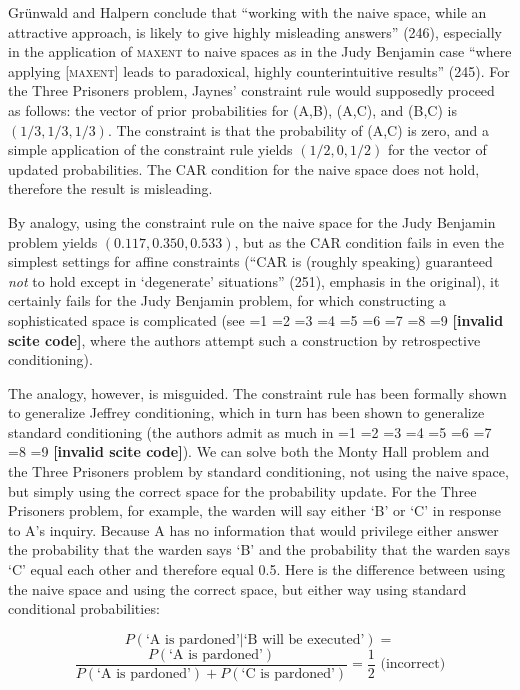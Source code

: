 \documentclass[smallextended]{svjour3}       %
\newcommand{\qnull}[1]{`#1'}
\newcommand{\qeins}[1]{``#1''}
\newcommand{\qzwei}[1]{`#1'}
\newcommand{\PageP}{p.~}
\newcommand{\PageP}{}
\newcommand{\scite}[3]{\ifnum#1=1\cite{#2}\else
\ifnum#1=2\cite[{\PageP}~#3]{#2}\else
\ifnum#1=3\cite[{\PageP}~#3]{#2}\else
\ifnum#1=4\cite{#2}\else
\ifnum#1=5\cite{#2}\else
\ifnum#1=6\cite[{\PageP}~#3]{#2}\else
\ifnum#1=7\cite{#2}\else
\ifnum#1=8\cite[{\PageP}~#3]{#2}\else
\ifnum#1=9\cite[{\PageP}~#3]{#2}\else
\textbf{[invalid scite code]}\fi\fi\fi\fi\fi\fi\fi\fi\fi}
\begin{document}
Gr{\"u}nwald and Halpern conclude that \qeins{working with the naive
  space, while an attractive approach, is likely to give highly
  misleading answers} (246), especially in the application of
\textsc{maxent} to naive spaces as in the Judy Benjamin case
\qeins{where applying [\textsc{maxent}] leads to paradoxical, highly
  counterintuitive results} (245). For the Three Prisoners problem,
Jaynes' constraint rule would supposedly proceed as follows: the
vector of prior probabilities for (A,B), (A,C), and (B,C) is
$(1/3,1/3,1/3)$. The constraint is that the probability of (A,C) is
zero, and a simple application of the constraint rule yields
$(1/2,0,1/2)$ for the vector of updated probabilities. The CAR
condition for the naive space does not hold, therefore the result is
misleading.

By analogy, using the constraint rule on the naive space for the Judy
Benjamin problem yields $(0.117,0.350,0.533)$, but as the CAR
condition fails in even the simplest settings for affine constraints
(\qeins{CAR is (roughly speaking) guaranteed \emph{not} to hold except
  in \qzwei{degenerate} situations} (251), emphasis in the original),
it certainly fails for the Judy Benjamin problem, for which
constructing a sophisticated space is complicated (see
\scite{7}{grovehalpern97}{}, where the authors attempt such a
construction by retrospective conditioning).

The analogy, however, is misguided. The constraint rule has been
formally shown to generalize Jeffrey conditioning, which in turn has
been shown to generalize standard conditioning (the authors admit as
much in \scite{8}{gruenwaldhalpern03}{262}). We can solve both the
Monty Hall problem and the Three Prisoners problem by standard
conditioning, not using the naive space, but simply using the correct
space for the probability update. For the Three Prisoners problem, for
example, the warden will say either \qnull{B} or \qnull{C} in response
to A's inquiry. Because A has no information that would privilege
either answer the probability that the warden says \qnull{B} and the
probability that the warden says \qnull{C} equal each other and
therefore equal 0.5. Here is the difference between using the naive
space and using the correct space, but either way using standard
conditional probabilities:

\begin{displaymath}
  P(\mbox{`A is pardoned'}|\mbox{`B will be
    executed'})=
\end{displaymath}
\begin{displaymath}
  \frac{P(\mbox{`A is pardoned'})}{P(\mbox{`A is
      pardoned'})+P(\mbox{`C is pardoned'})}=\frac{1}{2}\mbox{ (incorrect)}
\end{displaymath}
\end{document}
